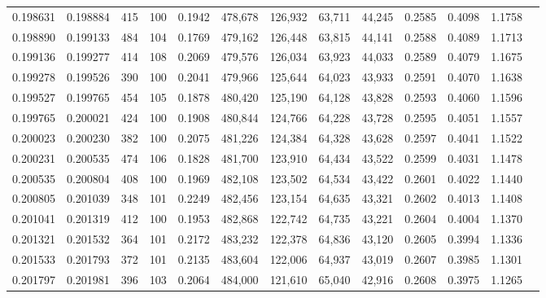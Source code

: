 \begin{tabular}{rrrrrrrrrrrrr}
0.198631 & 0.198884 &   415 & 100 &                                     0.1942 & 478,678 & 126,932 &  63,711 &  44,245 & 0.2585 & 0.4098 & 1.1758 \\
0.198890 & 0.199133 &   484 & 104 &                                     0.1769 & 479,162 & 126,448 &  63,815 &  44,141 & 0.2588 & 0.4089 & 1.1713 \\
0.199136 & 0.199277 &   414 & 108 &                                     0.2069 & 479,576 & 126,034 &  63,923 &  44,033 & 0.2589 & 0.4079 & 1.1675 \\
0.199278 & 0.199526 &   390 & 100 &                                     0.2041 & 479,966 & 125,644 &  64,023 &  43,933 & 0.2591 & 0.4070 & 1.1638 \\
0.199527 & 0.199765 &   454 & 105 &                                     0.1878 & 480,420 & 125,190 &  64,128 &  43,828 & 0.2593 & 0.4060 & 1.1596 \\
0.199765 & 0.200021 &   424 & 100 &                                     0.1908 & 480,844 & 124,766 &  64,228 &  43,728 & 0.2595 & 0.4051 & 1.1557 \\
0.200023 & 0.200230 &   382 & 100 &                                     0.2075 & 481,226 & 124,384 &  64,328 &  43,628 & 0.2597 & 0.4041 & 1.1522 \\
0.200231 & 0.200535 &   474 & 106 &                                     0.1828 & 481,700 & 123,910 &  64,434 &  43,522 & 0.2599 & 0.4031 & 1.1478 \\
0.200535 & 0.200804 &   408 & 100 &                                     0.1969 & 482,108 & 123,502 &  64,534 &  43,422 & 0.2601 & 0.4022 & 1.1440 \\
0.200805 & 0.201039 &   348 & 101 &                                     0.2249 & 482,456 & 123,154 &  64,635 &  43,321 & 0.2602 & 0.4013 & 1.1408 \\
0.201041 & 0.201319 &   412 & 100 &                                     0.1953 & 482,868 & 122,742 &  64,735 &  43,221 & 0.2604 & 0.4004 & 1.1370 \\
0.201321 & 0.201532 &   364 & 101 &                                     0.2172 & 483,232 & 122,378 &  64,836 &  43,120 & 0.2605 & 0.3994 & 1.1336 \\
0.201533 & 0.201793 &   372 & 101 &                                     0.2135 & 483,604 & 122,006 &  64,937 &  43,019 & 0.2607 & 0.3985 & 1.1301 \\
0.201797 & 0.201981 &   396 & 103 &                                     0.2064 & 484,000 & 121,610 &  65,040 &  42,916 & 0.2608 & 0.3975 & 1.1265 \\

\end{tabular}
